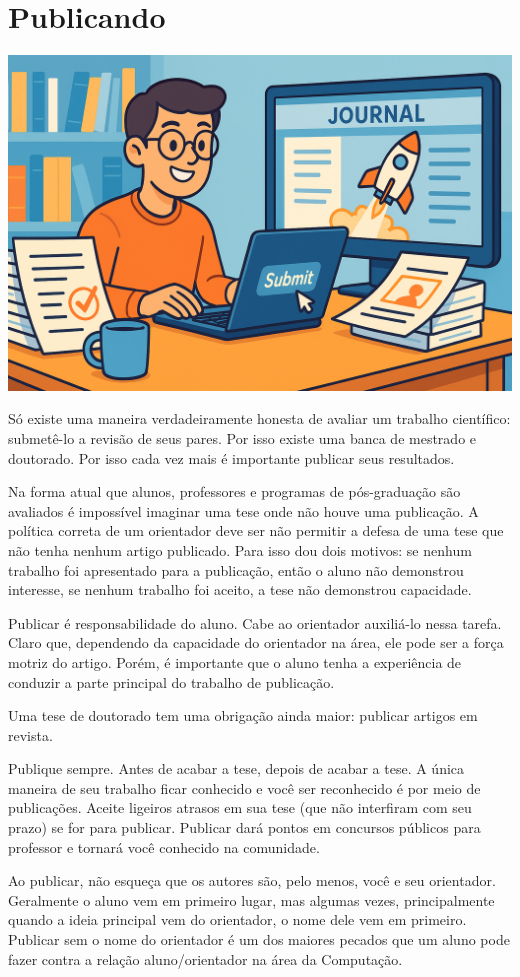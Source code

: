 \chapter{Publicando}

\begin{center}
\includegraphics[width=0.5\linewidth]{Images/publicando.png}    
\end{center}
\vspace{0.5cm}


Só existe uma maneira verdadeiramente honesta de avaliar um trabalho científico: submetê-lo a revisão de seus pares. 
Por isso existe uma banca de mestrado e doutorado. Por isso cada vez mais é importante publicar seus resultados.

Na forma atual que alunos, professores e programas de pós-graduação são avaliados é impossível imaginar uma tese onde não houve uma publicação.
A política correta de um orientador deve ser não permitir a defesa de uma tese que não tenha nenhum artigo publicado. Para isso dou dois motivos: se nenhum trabalho foi apresentado para a publicação, então o aluno não demonstrou interesse, se nenhum trabalho foi aceito, a tese não demonstrou capacidade.

Publicar é responsabilidade do aluno. Cabe ao orientador auxiliá-lo nessa tarefa. Claro que, dependendo da capacidade do orientador na área, ele pode ser a força motriz do artigo. Porém, é importante que o aluno tenha a experiência de conduzir a parte principal do trabalho de publicação.

Uma tese de doutorado tem uma obrigação ainda maior: publicar artigos em revista.

Publique sempre. Antes de acabar a tese, depois de acabar a tese. A única maneira de seu trabalho ficar conhecido e você ser reconhecido é por meio de publicações. Aceite ligeiros atrasos em sua tese (que não interfiram com seu prazo) se for para publicar. Publicar dará pontos em concursos públicos para professor e tornará você conhecido na comunidade.

Ao publicar, não esqueça que os autores são, pelo menos, você e seu orientador. Geralmente o aluno vem em primeiro lugar, mas algumas vezes, principalmente quando a ideia principal vem do orientador, o nome dele vem em primeiro. Publicar sem o nome do orientador é um dos maiores pecados que um aluno pode fazer contra a relação aluno/orientador na área da Computação.


